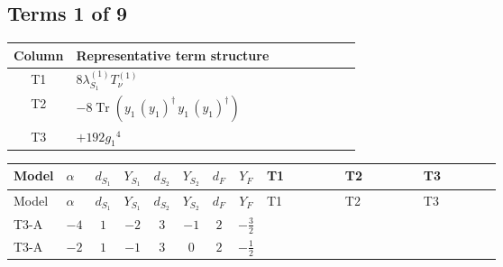 \documentclass[8pt]{article}
\begin{document}
\begin{landscape}
\subsection*{Terms 1 of 9}
\begin{center}
\begin{tabular}{@{}c >{\raggedright\arraybackslash}p{0.82\linewidth}@{}}
\toprule
Column & Representative term structure \\
\midrule
T1 & \(\displaystyle 8 {\lambda_{S_1}^{(1)}} T_{\nu}^{(1)}\) \\
\midrule
T2 & \(\displaystyle -8 \operatorname{Tr}\!\left({y_1}\,\left({y_1}\right)^{\dagger}\,{y_1}\,\left({y_1}\right)^{\dagger}\right)\) \\
\midrule
T3 & \(\displaystyle +192 {g_1}^4\) \\
\midrule
\bottomrule
\end{tabular}
\end{center}
\smallskip
\tiny
\begin{longtable}{@{}llcccccc >{\raggedright\arraybackslash}p{0.21\linewidth} >{\raggedright\arraybackslash}p{0.21\linewidth} >{\raggedright\arraybackslash}p{0.21\linewidth}@{}}
\toprule
Model & $\alpha$ & $d_{S_1}$ & $Y_{S_1}$ & $d_{S_2}$ & $Y_{S_2}$ & $d_F$ & $Y_F$ & T1 & T2 & T3 \\
\midrule
\endfirsthead
\toprule
Model & $\alpha$ & $d_{S_1}$ & $Y_{S_1}$ & $d_{S_2}$ & $Y_{S_2}$ & $d_F$ & $Y_F$ & T1 & T2 & T3 \\
\midrule
\endhead
T3-A & $-4$ & $1$ & $-2$ & $3$ & $-1$ & $2$ & $-\frac{3}{2}$ & \scriptsize\adjustbox{max width=\linewidth}{$\begin{gathered} 8 {\lambda_{S_1}^{(1)}} T_{\nu}^{(1)}\end{gathered}$} & \scriptsize\adjustbox{max width=\linewidth}{$\begin{gathered} -8 \operatorname{Tr}\!\left({y_1}\,\left({y_1}\right)^{\dagger}\,{y_1}\,\left({y_1}\right)^{\dagger}\right)\end{gathered}$} & \scriptsize\adjustbox{max width=\linewidth}{$\begin{gathered} +192 {g_1}^4\end{gathered}$} \\
\midrule
T3-A & $-2$ & $1$ & $-1$ & $3$ & $0$ & $2$ & $-\frac{1}{2}$ & \scriptsize\adjustbox{max width=\linewidth}{$\begin{gathered} 8 {\lambda_{S_1}^{(1)}} T_{\nu}^{(1)}\end{gathered}$} & \scriptsize\adjustbox{max width=\linewidth}{$\begin{gathered} -8 \operatorname{Tr}\!\left({y_1}\,\left({y_1}\right)^{\dagger}\,{y_1}\,\left({y_1}\right)^{\dagger}\right)\end{gathered}$} & \scriptsize\adjustbox{max width=\linewidth}{$\begin{gathered} +12 {g_1}^4\end{gathered}$} \\

\end{longtable}
\end{landscape}
\end{document}
